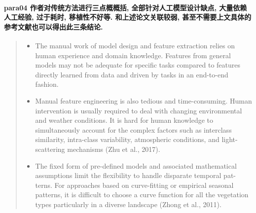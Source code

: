 \paragraph*{para04
    \textcolor[RGB]{17, 205, 29}{作者对传统方法进行三点概概括, 全部针对人工模型设计缺点, 大量依赖人工经验, 过于耗时, 移植性不好等. 和上述论文关联较弱, 甚至不需要上文具体的参考文献也可以得出此三条结论.}}
\begin{quotation}
    \itshape
    \begin{itemize}
        \item The manual work of model design and feature extraction relies on human experience and domain knowledge. Features from general models may not be adequate for specific tasks compared to features directly learned from data and driven by tasks in an end-to-end fashion.
        \item Manual feature engineering is also tedious and time-consuming. Human intervention is usually required to deal with changing environmental and weather conditions. It is hard for human knowledge to simultaneously account for the complex factors such as interclass similarity, intra-class variability, atmospheric conditions,
        and light-scattering mechanisms (Zhu et al., 2017).
        \item The fixed form of pre-defined models and associated mathematical assumptions limit the flexibility to handle disparate temporal pat-
        terns. For approaches based on curve-fitting or empirical seasonal patterns, it is difficult to choose a curve function for all the vegetation types particularly in a diverse landscape (Zhong et al., 2011).
    \end{itemize}
\end{quotation}

